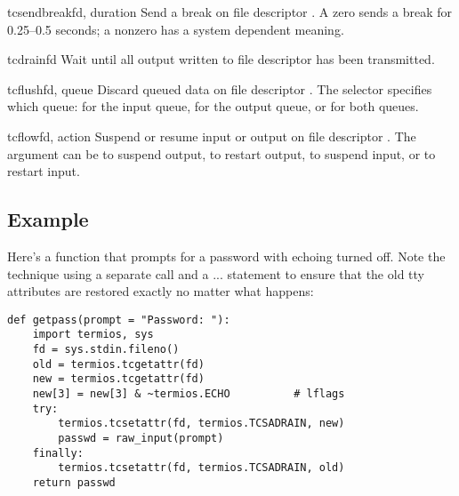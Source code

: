 \begin{funcdesc}{tcsendbreak}{fd, duration}
Send a break on file descriptor .  A zero  sends
a break for 0.25--0.5 seconds; a nonzero  has a system
dependent meaning.
\end{funcdesc}

\begin{funcdesc}{tcdrain}{fd}
Wait until all output written to file descriptor  has been
transmitted.
\end{funcdesc}

\begin{funcdesc}{tcflush}{fd, queue}
Discard queued data on file descriptor .  The 
selector specifies which queue:  for the input
queue,  for the output queue, or
 for both queues.
\end{funcdesc}

\begin{funcdesc}{tcflow}{fd, action}
Suspend or resume input or output on file descriptor .  The
 argument can be  to suspend output,
 to restart output,  to suspend
input, or  to restart input.
\end{funcdesc}


\begin{seealso}
\end{seealso}


\subsection{Example}

Here's a function that prompts for a password with echoing turned
off.  Note the technique using a separate  call
and a  ...  statement to ensure that the
old tty attributes are restored exactly no matter what happens:

\begin{verbatim}
def getpass(prompt = "Password: "):
    import termios, sys
    fd = sys.stdin.fileno()
    old = termios.tcgetattr(fd)
    new = termios.tcgetattr(fd)
    new[3] = new[3] & ~termios.ECHO          # lflags
    try:
        termios.tcsetattr(fd, termios.TCSADRAIN, new)
        passwd = raw_input(prompt)
    finally:
        termios.tcsetattr(fd, termios.TCSADRAIN, old)
    return passwd
\end{verbatim}
